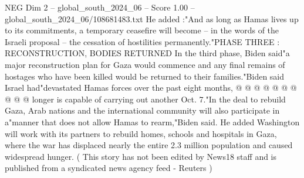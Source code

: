 \begin{textsample}{NEG Dim 2 – global\_south\_2024\_06 – Score 1.00 – global\_south\_2024\_06/108681483.txt}
He added :"And as long as Hamas lives up to its commitments, a temporary ceasefire will become -- in the words of the Israeli proposal -- the cessation of hostilities permanently."PHASE THREE : RECONSTRUCTION, BODIES RETURNED In the third phase, Biden said"a major reconstruction plan for Gaza would commence and any final remains of hostages who have been killed would be returned to their families."Biden said Israel had"devastated Hamas forces over the past eight months, @ @ @ @ @ @ @ @ @ @ longer is capable of carrying out another Oct. 7."In the deal to rebuild Gaza, Arab nations and the international community will also participate in a"manner that does not allow Hamas to rearm,"Biden said.
He added Washington will work with its partners to rebuild homes, schools and hospitals in Gaza, where the war has displaced nearly the entire 2.3 million population and caused widespread hunger. ( This story has not been edited by News18 staff and is published from a syndicated news agency feed - Reuters )

\end{textsample}
